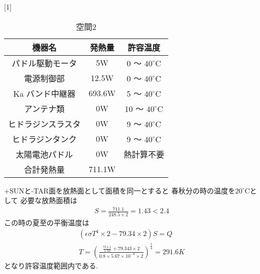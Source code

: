 \begin{table}[H]
  \begin{center}
  \caption{空間2}
  \scalebox{1}[1]{
  \begin{tabular}{|c|c|c|} \hline
    機器名 &  発熱量 & 許容温度 \\ \hline

  パドル駆動モータ
  & 5W
  & 0 〜 ${40}^\circ\mathrm{C}$\\

  電源制御部
  & 12.5W
  & 0 〜 ${40}^\circ\mathrm{C}$\\

  Ka バンド中継器
  & 693.6W
  & 5 〜 ${40}^\circ\mathrm{C}$\\

  アンテナ類
  & 0W
  & 10 〜 ${40}^\circ\mathrm{C}$\\

  ヒドラジンスラスタ
  & 0W
  & 9 〜 ${40}^\circ\mathrm{C}$\\

  ヒドラジンタンク
  & 0W
  & 9 〜 ${40}^\circ\mathrm{C}$\\

  太陽電池パドル
  & 0W
  &  熱計算不要\\ \hline

  合計発熱量
  & 711.1W
  & \\\hline
  \end{tabular}
  }
\end{center}
\end{table}

+SUNと-TAR面を放熱面として面積を同一とすると
春秋分の時の温度を${20}^\circ\mathrm{C}$として
必要な放熱面積は
\begin{eqnarray}
  S=\frac{711.1}{248.5\times2}=1.43<2.4
\end{eqnarray}
この時の夏至の平衡温度は
\begin{eqnarray}
  (\epsilon\sigma T^4\times2 -79.34\times2)S=Q\\
  T =(\frac{\frac{711.1}{1.43}+79.343\times2}
  {0.8\times5.67\times10^{-8}\times2})^{\frac{1}{4}}=291.6K
\end{eqnarray}
となり許容温度範囲内である.


